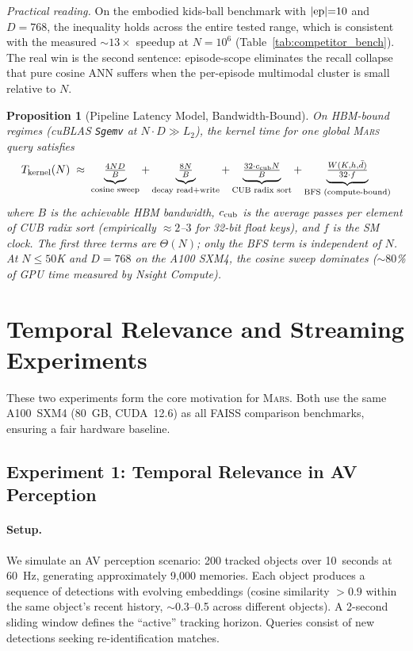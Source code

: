 \documentclass[11pt]{article}
\newtheorem{proposition}[theorem]{Proposition}
\newcommand{\mars}{\textsc{Mars}}
\begin{document}
\noindent\textit{Practical reading.} On the embodied kids-ball
benchmark with $|\textnormal{ep}|{=}10$ and $D{=}768$, the inequality
holds across the entire tested range, which is consistent with the
measured ${\sim}13\times$ speedup at $N{=}10^6$
(Table~\ref{tab:competitor_bench}). The real win is the second
sentence: episode-scope eliminates the recall collapse that pure
cosine ANN suffers when the per-episode multimodal cluster is small
relative to $N$.

\begin{proposition}[Pipeline Latency Model, Bandwidth-Bound]
\label{prop:latency}
On HBM-bound regimes (cuBLAS \texttt{Sgemv} at $N \cdot D \gg L_2$),
the kernel time for one global \mars{} query satisfies
\[
T_{\mathrm{kernel}}(N) \;\approx\;
  \underbrace{\tfrac{4 N D}{B}}_{\text{cosine sweep}}
  + \underbrace{\tfrac{8N}{B}}_{\text{decay read+write}}
  + \underbrace{\tfrac{32 \cdot c_{\textnormal{cub}} N}{B}}_{\text{CUB radix sort}}
  + \underbrace{\tfrac{W(K,h,\bar{d})}{32 \cdot f}}_{\text{BFS (compute-bound)}}
\]
where $B$ is the achievable HBM bandwidth, $c_{\textnormal{cub}}$ is
the average passes per element of CUB radix sort
(\textit{empirically} $\approx 2$--$3$ for 32-bit float keys), and
$f$ is the SM clock. The first three terms are $\Theta(N)$; only the
BFS term is independent of $N$. At $N \le 50$K and $D{=}768$ on the
A100 SXM4, the cosine sweep dominates (${\sim}80$\% of GPU time
measured by Nsight Compute).
\end{proposition}

\section{Temporal Relevance and Streaming Experiments}
\label{sec:temporal}

These two experiments form the core motivation for \mars{}. Both use the
same A100~SXM4 (80~GB, CUDA~12.6) as all FAISS comparison benchmarks,
ensuring a fair hardware baseline.

\subsection{Experiment 1: Temporal Relevance in AV Perception}
\label{sec:temporal_relevance}

\paragraph{Setup.} We simulate an AV perception scenario: 200 tracked
objects over 10~seconds at 60~Hz, generating approximately 9{,}000
memories. Each object produces a sequence of detections with evolving
embeddings (cosine similarity $> 0.9$ within the same object's recent
history, $\sim$0.3--0.5 across different objects). A 2-second sliding
window defines the ``active'' tracking horizon. Queries consist of new
detections seeking re-identification matches.
\end{document}
